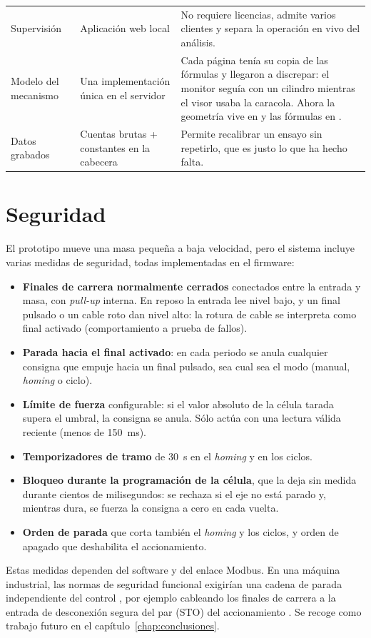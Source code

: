 \begin{longtable}{@{}L{0.19\textwidth}L{0.21\textwidth}L{0.48\textwidth}@{}}
Supervisión & Aplicación web local & No requiere licencias, admite varios clientes y separa la operación en vivo del análisis. \\
Modelo del mecanismo & Una implementación única en el servidor & Cada página tenía su copia de las fórmulas y llegaron a discrepar: el monitor seguía con un cilindro mientras el visor usaba la caracola. Ahora la geometría vive en  y las fórmulas en . \\
Datos grabados & Cuentas brutas + constantes en la cabecera & Permite recalibrar un ensayo sin repetirlo, que es justo lo que ha hecho falta. \\
\bottomrule
\end{longtable}

\section{Seguridad}
\label{sec:arq-seguridad}

El prototipo mueve una masa pequeña a baja velocidad, pero el sistema incluye varias medidas de
seguridad, todas implementadas en el firmware:

\begin{itemize}
  \item \textbf{Finales de carrera normalmente cerrados} conectados entre la entrada y masa, con
        \emph{pull-up} interna. En reposo la entrada lee nivel bajo, y un final pulsado o un cable
        roto dan nivel alto: la rotura de cable se interpreta como final activado (comportamiento a
        prueba de fallos).
  \item \textbf{Parada hacia el final activado}: en cada periodo se anula cualquier consigna que
        empuje hacia un final pulsado, sea cual sea el modo (manual, \emph{homing} o ciclo).
  \item \textbf{Límite de fuerza} configurable: si el valor absoluto de la célula tarada supera el
        umbral, la consigna se anula. Sólo actúa con una lectura válida reciente (menos de
        \SI{150}{\milli\second}).
  \item \textbf{Temporizadores de tramo} de \SI{30}{\second} en el \emph{homing} y en los ciclos.
  \item \textbf{Bloqueo durante la programación de la célula}, que la deja sin medida durante
        cientos de milisegundos: se rechaza si el eje no está parado y, mientras dura, se fuerza la
        consigna a cero en cada vuelta.
  \item \textbf{Orden de parada} que corta también el \emph{homing} y los ciclos, y orden de apagado
        que deshabilita el accionamiento.
\end{itemize}

Estas medidas dependen del software y del enlace Modbus. En una máquina industrial, las normas de
seguridad funcional exigirían una cadena de parada independiente del control \cite{iso13849}, por
ejemplo cableando los finales de carrera a la entrada de desconexión segura del par (STO) del
accionamiento \cite{iec61800}. Se recoge como trabajo futuro en el
capítulo~\ref{chap:conclusiones}.
